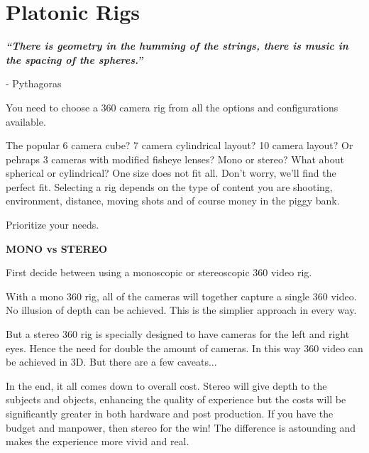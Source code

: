 \chapter{Platonic Rigs}
\pagecolor{white}
\label{chap:2}
\begin{fullwidth}

{\itshape\bfseries “There is geometry in the humming of the strings, there is music in the spacing of the spheres.”}

- Pythagoras
\vspace{\baselineskip}

\problem

{\large You need to choose a 360 camera rig from all the options and configurations available. \par}

The popular 6 camera cube? 7 camera cylindrical layout? 10 camera layout? Or pehraps 3 cameras with modified fisheye lenses? Mono or stereo? What about spherical or cylindrical? One size does not fit all. Don’t worry, we’ll find the perfect fit. Selecting a rig depends on the type of content you are shooting, environment, distance, moving shots and of course money in the piggy bank.

\solution

{\large Prioritize your needs. \par}

{\bfseries MONO vs STEREO}

\clearpage
First decide between using a monoscopic or stereoscopic 360 video rig. 

With a mono 360 rig, all of the cameras will together capture a single 360 video. No illusion of depth can be achieved. This is the simplier approach in every way.

But a stereo 360 rig is specially designed to have cameras for the left and right eyes. Hence the need for double the amount of cameras. In this way 360 video can be achieved in 3D. But there are a few caveats...

In the end, it all comes down to overall cost. Stereo will give depth to the subjects and objects, enhancing the quality of experience but the costs will be significantly greater in both hardware and post production. If you have the budget and manpower, then stereo for the win! The difference is astounding and makes the experience more vivid and real. 


\end{fullwidth}

